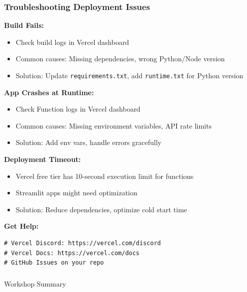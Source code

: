 \begin{frame}[fragile]\frametitle{Troubleshooting Deployment Issues}
\textbf{Build Fails:}
  \begin{itemize}
    \item Check build logs in Vercel dashboard
    \item Common causes: Missing dependencies, wrong Python/Node version
    \item Solution: Update \texttt{requirements.txt}, add \texttt{runtime.txt} for Python version
  \end{itemize}

\textbf{App Crashes at Runtime:}
  \begin{itemize}
    \item Check Function logs in Vercel dashboard
    \item Common causes: Missing environment variables, API rate limits
    \item Solution: Add env vars, handle errors gracefully
  \end{itemize}

\textbf{Deployment Timeout:}
  \begin{itemize}
    \item Vercel free tier has 10-second execution limit for functions
    \item Streamlit apps might need optimization
    \item Solution: Reduce dependencies, optimize cold start time
  \end{itemize}

\textbf{Get Help:}
\begin{lstlisting}
# Vercel Discord: https://vercel.com/discord
# Vercel Docs: https://vercel.com/docs
# GitHub Issues on your repo
\end{lstlisting}
\end{frame}

\begin{frame}[fragile]\frametitle{}
\begin{center}
{\Large Workshop Summary}
\end{center}
\end{frame}


